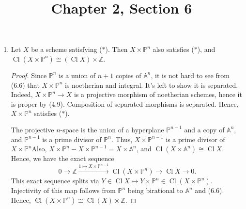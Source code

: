 \documentclass{article}
\title{Chapter 2, Section 6}
\newcommand{\PP}{\mathbb{P}}
\newcommand{\A}{\mathbb{A}}
\newcommand{\Z}{\mathbb{Z}}
\DeclareMathOperator{\cl}{Cl}
\begin{document}
\maketitle
\begin{enumerate} [label=\textbf{\arabic*.}, leftmargin=0em]

\item Let $X$ be a scheme satisfying ($*$). Then $X \times \PP^n$ also satisfies ($*$), and $\cl (X \times \PP^n) \cong (\cl X) \times \Z$.

\begin{proof}
    Since $\PP^n$ is a union of $n+1$ copies of $\A^n$, it is not hard to see from (6.6) that $X \times \PP^n$ is noetherian and integral. It's left to show it is separated. Indeed, $X \times \PP^n \to X$ is a projective morphism of noetherian schemes, hence it is proper by (4.9). Composition of separated morphisms is separated. Hence, $X \times \PP^n$ satisfies ($*$).

    The projective $n$-space is the union of a hyperplane $\PP^{n - 1}$ and a copy of $\A^n$, and $\PP^{n - 1}$ is a prime divisor of $\PP^n$. Thus, $X \times \PP^{n-1}$ is a prime divisor of $X \times \PP^n$Also, $X \times \PP^n - X \times \PP^{n-1} = X \times \A^n$, and $\cl(X \times \A^n) \cong \cl{X}$. Hence, we have the exact sequence
    \begin{equation*}
        0 \to \Z \xrightarrow{1 \mapsto X \times \PP^{n-1}} \cl(X \times \PP^n) \to \cl{X} \to 0.
    \end{equation*} 
    This exact sequence splits via $Y \in \cl{X} \mapsto Y \times \PP^n \in \cl(X \times \PP^n)$. Injectivity of this map follows from $\PP^n$ being birational to $\A^n$ and (6.6). Hence, $\cl(X \times \PP^n) \cong \cl(X) \times \Z$.
\end{proof}


\end{enumerate}
\end{document}
